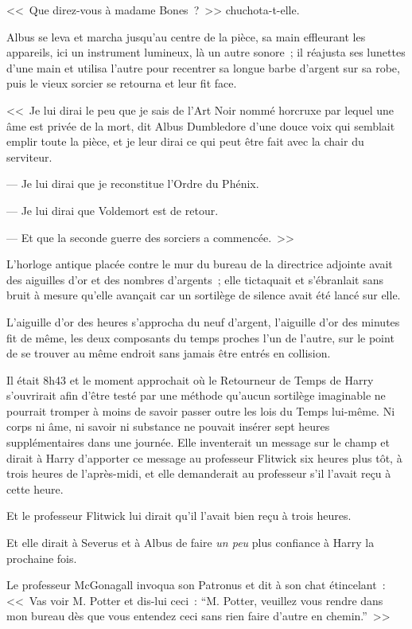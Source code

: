 <<~Que direz-vous à madame Bones~?~>> chuchota-t-elle.

Albus se leva et marcha jusqu'au centre de la pièce, sa main effleurant les appareils, ici un instrument lumineux, là un autre sonore~; il réajusta ses lunettes d'une main et utilisa l'autre pour recentrer sa longue barbe d'argent sur sa robe, puis le vieux sorcier se retourna et leur fit face.

<<~Je lui dirai le peu que je sais de l'Art Noir nommé horcruxe par lequel une âme est privée de la mort, dit Albus Dumbledore d'une douce voix qui semblait emplir toute la pièce, et je leur dirai ce qui peut être fait avec la chair du serviteur.

--- Je lui dirai que je reconstitue l'Ordre du Phénix.

--- Je lui dirai que Voldemort est de retour.

--- Et que la seconde guerre des sorciers a commencée.~>>


L'horloge antique placée contre le mur du bureau de la directrice adjointe avait des aiguilles d'or et des nombres d'argents~; elle tictaquait et s'ébranlait sans bruit à mesure qu'elle avançait car un sortilège de silence avait été lancé sur elle.

L'aiguille d'or des heures s'approcha du neuf d'argent, l'aiguille d'or des minutes fit de même, les deux composants du temps proches l'un de l'autre, sur le point de se trouver au même endroit sans jamais être entrés en collision.

Il était 8h43 et le moment approchait où le Retourneur de Temps de Harry s'ouvrirait afin d'être testé par une méthode qu'aucun sortilège imaginable ne pourrait tromper à moins de savoir passer outre les lois du Temps lui-même. Ni corps ni âme, ni savoir ni substance ne pouvait insérer sept heures supplémentaires dans une journée. Elle inventerait un message sur le champ et dirait à Harry d'apporter ce message au professeur Flitwick six heures plus tôt, à trois heures de l'après-midi, et elle demanderait au professeur s'il l'avait reçu à cette heure.

Et le professeur Flitwick lui dirait qu'il l'avait bien reçu à trois heures.

Et elle dirait à Severus et à Albus de faire \emph{un peu} plus confiance à Harry la prochaine fois.

Le professeur McGonagall invoqua son Patronus et dit à son chat étincelant~: <<~Vas voir M. Potter et dis-lui ceci~: “M. Potter, veuillez vous rendre dans mon bureau dès que vous entendez ceci sans rien faire d'autre en chemin.”~>>
